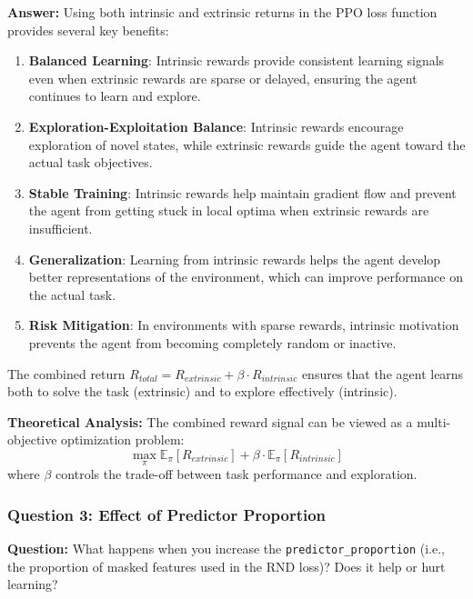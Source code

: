 \documentclass[12pt]{article}
\begin{document}
{{{\textbf{Answer:} Using both intrinsic and extrinsic returns in the PPO loss function provides several key benefits:

\begin{enumerate}
    \item \textbf{Balanced Learning}: Intrinsic rewards provide consistent learning signals even when extrinsic rewards are sparse or delayed, ensuring the agent continues to learn and explore.
    
    \item \textbf{Exploration-Exploitation Balance}: Intrinsic rewards encourage exploration of novel states, while extrinsic rewards guide the agent toward the actual task objectives.
    
    \item \textbf{Stable Training}: Intrinsic rewards help maintain gradient flow and prevent the agent from getting stuck in local optima when extrinsic rewards are insufficient.
    
    \item \textbf{Generalization}: Learning from intrinsic rewards helps the agent develop better representations of the environment, which can improve performance on the actual task.
    
    \item \textbf{Risk Mitigation}: In environments with sparse rewards, intrinsic motivation prevents the agent from becoming completely random or inactive.
\end{enumerate}

The combined return $R_{total} = R_{extrinsic} + \beta \cdot R_{intrinsic}$ ensures that the agent learns both to solve the task (extrinsic) and to explore effectively (intrinsic).

\textbf{Theoretical Analysis:} The combined reward signal can be viewed as a multi-objective optimization problem:
\begin{equation}
\max_{\pi} \mathbb{E}_{\pi}[R_{extrinsic}] + \beta \cdot \mathbb{E}_{\pi}[R_{intrinsic}]
\end{equation}
where $\beta$ controls the trade-off between task performance and exploration.

\subsubsection{Question 3: Effect of Predictor Proportion}

\textbf{Question:} What happens when you increase the \texttt{predictor\_proportion} (i.e., the proportion of masked features used in the RND loss)? Does it help or hurt learning?

}}}
\end{document}
